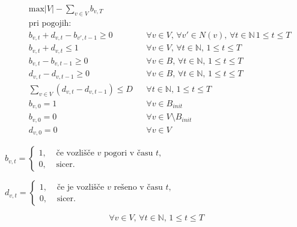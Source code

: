 \documentclass[a4paper, 11pt]{article}
\begin{document}
\begin{myquote}

    \begin{align*}
        & \text{max} \left|V\right| - \sum_{v \in V}{b_{v, T}} \\
        & \text{pri pogojih:} \\
        & b_{v,t} + d_{v,t} - b_{v',t-1} \ge 0 && \forall v \in V ,\, \forall v' \in N(v) ,\, \forall t \in \mathbb{N} \, 1 \le t \le T \\
        & b_{v,t} + d_{v,t} \le 1 && \forall v \in V ,\, \forall t \in \mathbb{N} ,\, 1 \le t \le T \\
        & b_{v,t} - b_{v,t-1} \ge 0 && \forall v \in B ,\, \forall t \in \mathbb{N} ,\, 1 \le t \le T \\
        & d_{v,t} - d_{v,t-1} \ge 0 && \forall v \in B ,\, \forall t \in \mathbb{N} ,\, 1 \le t \le T \\
        & \sum_{v \in V}{\left( d_{v,t} - d_{v, t-1} \right)} \le D && \forall t \in \mathbb{N} ,\, 1 \le t \le T \\
        & b_{v,0} = 1 && \forall v \in B_{init} \\
        & b_{v,0} = 0 && \forall v \in V \setminus B_{init} \\
        & d_{v,0} = 0 && \forall v \in V %
    \end{align*}

    $ b_{v,t} = \begin{cases}
        1, & \text{ če  vozlišče $v$ pogori v času $t$} ,\\
        0, & \text{ sicer.}
        \end{cases} $

    $ d_{v,t} = \begin{cases}
            1, & \text{ če je vozlišče $v$ rešeno v času $t$} ,\\
            0, & \text{ sicer.}
            \end{cases} $

    $$
        \forall v \in V ,\, \forall t \in \mathbb{N} ,\, 1 \le t \le T
    $$

\end{myquote}
\end{document}
